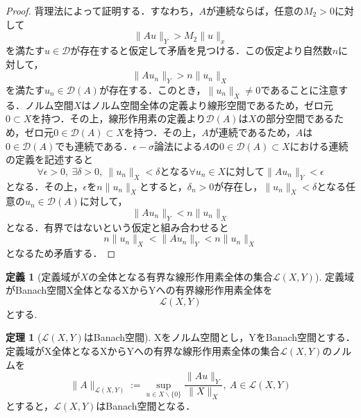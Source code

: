 \documentclass[11pt,a4paper]{jsarticle}
\theoremstyle{definition}
\newtheorem{dfn}{定義}
\newtheorem{thm}{定理}
\begin{document}
\begin{proof}
  背理法によって証明する．すなわち，$A$が連続ならば，任意の$M_2>0$に対して
  \begin{equation*}
    \|Au\|_Y>M_2\|u\|_x
  \end{equation*}
  を満たす$u\in\mathcal{D}$が存在すると仮定して矛盾を見つける．この仮定より自然数$n$に対して，
  \begin{equation*}
    \|Au_n\|_Y>n\|u_n\|_X
  \end{equation*}
  を満たす$u_n\in\mathcal{D}(A)$が存在する．このとき，$\|u_n\|_X\neq 0$であることに注意する．ノルム空間$X$はノルム空間全体の定義より線形空間であるため，ゼロ元$0\subset X$を持つ．その上，線形作用素の定義より$\mathcal{D}(A)$は$X$の部分空間であるため，ゼロ元$0\in\mathcal{D}(A)\subset X$を持つ．その上，$A$が連続であるため，$A$は$0\in\mathcal{D}(A)$でも連続である．$\epsilon-\sigma$論法による$A$の$0\in\mathcal{D}(A)\subset X$における連続の定義を記述すると
  \begin{equation*}
    \forall\epsilon>0,\ \exists\delta>0,\ \|u_n\|_X<\delta となる\forall u_n\in Xに対して\|Au_n\|_Y<\epsilon
  \end{equation*}
  となる．その上，$\epsilon$を$n\|u_n\|_X$とすると，$\delta_n>0$が存在し，$\|u_n\|_X<\delta$となる任意の$u_n\in\mathcal{D}(A)$に対して，
  \begin{equation*}
    \|Au_n\|_Y<n\|u_n\|_X
  \end{equation*}
  となる．有界ではないという仮定と組み合わせると
  \begin{equation*}
    n\|u_n\|_X<\|Au_n\|_Y<n\|u_n\|_X
  \end{equation*}
  となるため矛盾する．
\end{proof}

\begin{dfn}[定義域が$X$の全体となる有界な線形作用素全体の集合$\mathcal{L}(X,Y)$]
  定義域がBanach空間X全体となるXからYへの有界線形作用素全体を
  \begin{equation*}
    \mathcal{L}(X,Y)
  \end{equation*}
  とする.
\end{dfn}

\begin{thm}[$\mathcal{L}(X,Y)$はBanach空間]
  Xをノルム空間とし，YをBanach空間とする．定義域がX全体となるXからYへの有界な線形作用素全体の集合$\mathcal{L}(X,Y)$のノルムを
  \begin{equation*}
    \|A\|_{\mathcal{L}(X,Y)}:=\sup_{u\in X\backslash\{0\}} \frac{\|Au\|_Y}{\|X\|_X}, \ A\in\mathcal{L}(X,Y)
  \end{equation*}
  とすると，$\mathcal{L}(X,Y)$はBanach空間となる．
\end{thm}
\end{document}

